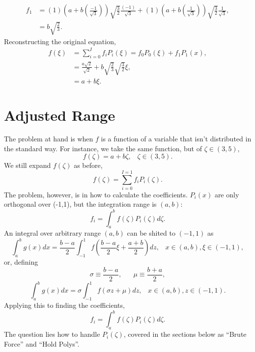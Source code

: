 \documentclass[11pt]{article} %
\begin{document}
\begin{align}
f_1 &=(1)\left(a+b\left(\frac{-1}{\sqrt{3}}\right)\right)\sqrt{\frac{3}{2}}\frac{(-1)}{\sqrt{3}} + (1)\left(a+b\left(\frac{1}{\sqrt{3}}\right)\right)\sqrt{\frac{3}{2}}\frac{1}{\sqrt{3}},\\
  &=b\sqrt{\frac{2}{3}}.
\end{align}
Reconstructing the original equation,
\begin{align}
f(\xi)&=\sum_{i=0}^{I}f_iP_i(\xi)=f_0P_0(\xi) + f_1P_1(x),\\
  &=\frac{a\sqrt{2}}{\sqrt{2}}+b\sqrt{\frac{2}{3}}\sqrt{\frac{3}{2}}\xi,\\
    &=a+b\xi.
\end{align}

\section{Adjusted Range}
The problem at hand is when $f$ is a function of a variable that isn't distributed in the standard way.  For instance, we take the same function, but of $\zeta\in(3,5)$,
\begin{equation}
f(\zeta) = a+b\zeta, \hspace{10pt}\zeta\in(3,5).
\end{equation}
We still expand $f(\zeta)$ as before,
\begin{equation}
f(\zeta) = \sum_{i=0}^{I=1}f_iP_i(\zeta).
\end{equation}
The problem, however, is in how to calculate the coefficients.  $P_i(x)$ are only orthogonal over (-1,1), but the integration range is $(a,b)$:
\begin{equation}
f_i=\int_a^b f(\zeta)P_i(\zeta) d\zeta.
\end{equation}
An integral over arbitrary range $(a,b)$ can be shited to $(-1,1)$ as
\begin{equation}
\int_a^b g(x)dx = \frac{b-a}{2}\int_{-1}^1 f\left(\frac{b-a}{2}\xi+\frac{a+b}{2}\right)dz, \hspace{10pt}x\in(a,b),\xi\in(-1,1),
\end{equation}
or, defining
\begin{equation}
\sigma \equiv \frac{b-a}{2},\hspace{20pt}\mu\equiv\frac{b+a}{2},
\end{equation}
\begin{equation}
\int_a^b g(x)dx = \sigma\int_{-1}^1 f\left(\sigma z+\mu\right)dz, \hspace{10pt}x\in(a,b),z\in(-1,1).
\end{equation}
Applying this to finding the coefficients,
\begin{equation}
f_i=\int_a^b f(\zeta)P_i(\zeta)d\zeta.
\end{equation}
The question lies how to handle $P_i(\zeta)$, covered in the sections below as ``Brute Force'' and ``Hold Polys''.
\end{document}
